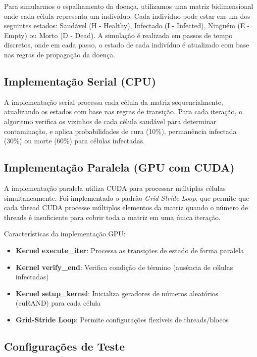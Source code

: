 \documentclass{article}
\begin{document}
Para simularmos o espalhamento da doença, utilizamos uma matriz bidimensional onde cada célula representa um indivíduo. Cada indivíduo pode estar em um dos seguintes estados: Saudável (H - Healthy), Infectado (I - Infected), Ninguém (E - Empty) ou Morto (D - Dead). A simulação é realizada em passos de tempo discretos, onde em cada passo, o estado de cada indivíduo é atualizado com base nas regras de propagação da doença.



\subsection{Implementação Serial (CPU)}

A implementação serial processa cada célula da matriz sequencialmente, atualizando os estados com base nas regras de transição. Para cada iteração, o algoritmo verifica os vizinhos de cada célula saudável para determinar contaminação, e aplica probabilidades de cura (10\%), permanência infectada (30\%) ou morte (60\%) para células infectadas.

\subsection{Implementação Paralela (GPU com CUDA)}

A implementação paralela utiliza CUDA para processar múltiplas células simultaneamente. Foi implementado o padrão \textit{Grid-Stride Loop}, que permite que cada thread CUDA processe múltiplos elementos da matriz quando o número de threads é insuficiente para cobrir toda a matriz em uma única iteração.

Características da implementação GPU:
\begin{itemize}
    \item \textbf{Kernel execute\_iter}: Processa as transições de estado de forma paralela
    \item \textbf{Kernel verify\_end}: Verifica condição de término (ausência de células infectadas)
    \item \textbf{Kernel setup\_kernel}: Inicializa geradores de números aleatórios (cuRAND) para cada célula
    \item \textbf{Grid-Stride Loop}: Permite configurações flexíveis de threads/blocos
\end{itemize}

\subsection{Configurações de Teste}
\end{document}
